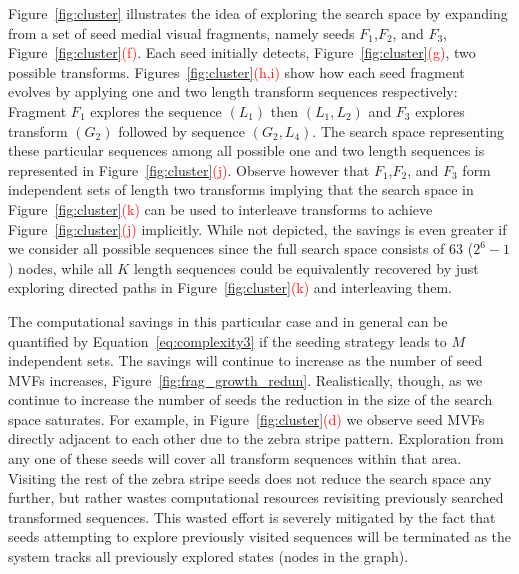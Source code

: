Figure~\ref{fig:cluster} illustrates the idea of exploring the search space by expanding from a set of seed medial visual fragments, namely seeds $F_1$,$F_2$, and $F_3$, Figure~\ref{fig:cluster}\textcolor{red}{(f)}. Each seed initially detects, Figure~\ref{fig:cluster}\textcolor{red}{(g)}, two possible transforms. Figures~\ref{fig:cluster}\textcolor{red}{(h,i)} show how each seed fragment evolves by applying one and two length transform sequences respectively: Fragment $F_1$ explores the sequence $(L_1)$ then $(L_1,L_2)$ and $F_3$ explores transform $(G_2)$ followed by sequence $(G_2,L_4)$. The search space representing these particular sequences among all possible one and two length sequences is represented in Figure~\ref{fig:cluster}\textcolor{red}{(j)}. Observe however that $F_1$,$F_2$, and $F_3$ form independent sets of length two transforms implying that the search space in Figure~\ref{fig:cluster}\textcolor{red}{(k)} can be used to interleave transforms to achieve Figure~\ref{fig:cluster}\textcolor{red}{(j)} implicitly. While not depicted, the savings is even greater if we consider all possible sequences since the full search space consists of 63 ($2^6-1$) nodes, while all $K$ length sequences could be equivalently recovered by just exploring directed paths in Figure~\ref{fig:cluster}\textcolor{red}{(k)} and interleaving them. 

The computational savings in this particular case and in general can be quantified by Equation~\ref{eq:complexity3} if the seeding strategy leads to $M$ independent sets. The savings will continue to increase as the number of seed MVFs increases, Figure~\ref{fig:frag_growth_redun}. Realistically, though, as we continue to increase the number of seeds the reduction in the size of the search space saturates. For example, in Figure~\ref{fig:cluster}\textcolor{red}{(d)} we observe seed MVFs directly adjacent to each other due to the zebra stripe pattern. Exploration from any one of these seeds will cover all transform sequences within that area. Visiting the rest of the zebra stripe seeds does not reduce the search space any further, but rather wastes computational resources revisiting previously searched transformed sequences. This wasted effort is severely mitigated by the fact that seeds attempting to explore previously visited sequences will be terminated as the system tracks all previously explored states (nodes in the graph).   


